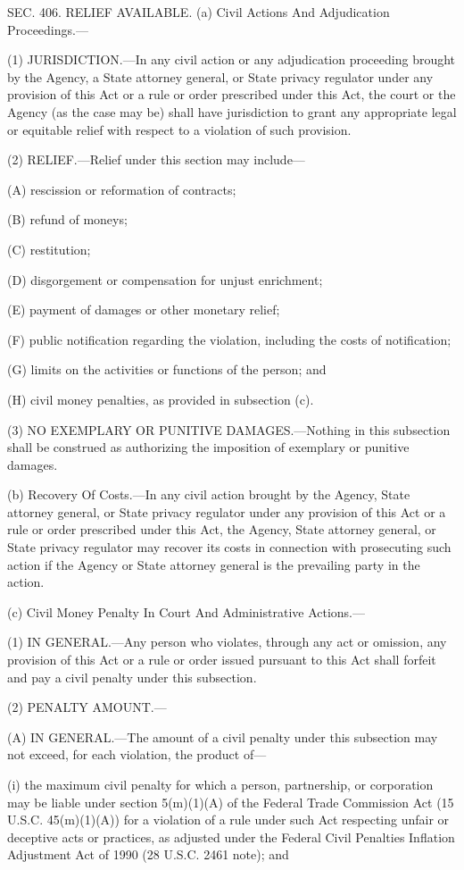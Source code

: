 SEC. 406. RELIEF AVAILABLE.
(a) Civil Actions And Adjudication Proceedings.—

(1) JURISDICTION.—In any civil action or any adjudication proceeding brought by the Agency, a State attorney general, or State privacy regulator under any provision of this Act or a rule or order prescribed under this Act, the court or the Agency (as the case may be) shall have jurisdiction to grant any appropriate legal or equitable relief with respect to a violation of such provision.

(2) RELIEF.—Relief under this section may include—

(A) rescission or reformation of contracts;

(B) refund of moneys;

(C) restitution;

(D) disgorgement or compensation for unjust enrichment;

(E) payment of damages or other monetary relief;

(F) public notification regarding the violation, including the costs of notification;

(G) limits on the activities or functions of the person; and

(H) civil money penalties, as provided in subsection (c).

(3) NO EXEMPLARY OR PUNITIVE DAMAGES.—Nothing in this subsection shall be construed as authorizing the imposition of exemplary or punitive damages.

(b) Recovery Of Costs.—In any civil action brought by the Agency, State attorney general, or State privacy regulator under any provision of this Act or a rule or order prescribed under this Act, the Agency, State attorney general, or State privacy regulator may recover its costs in connection with prosecuting such action if the Agency or State attorney general is the prevailing party in the action.

(c) Civil Money Penalty In Court And Administrative Actions.—

(1) IN GENERAL.—Any person who violates, through any act or omission, any provision of this Act or a rule or order issued pursuant to this Act shall forfeit and pay a civil penalty under this subsection.

(2) PENALTY AMOUNT.—

(A) IN GENERAL.—The amount of a civil penalty under this subsection may not exceed, for each violation, the product of—

(i) the maximum civil penalty for which a person, partnership, or corporation may be liable under section 5(m)(1)(A) of the Federal Trade Commission Act (15 U.S.C. 45(m)(1)(A)) for a violation of a rule under such Act respecting unfair or deceptive acts or practices, as adjusted under the Federal Civil Penalties Inflation Adjustment Act of 1990 (28 U.S.C. 2461 note); and

